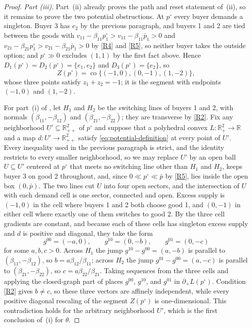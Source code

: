 \documentclass[11pt,a4paper,fleqn]{article}
\theoremstyle{plain}
\theoremstyle{definition}
\newcommand{\R}{\mathbb{R}}
\newcommand{\co}{\operatorname{co}}
\begin{document}
\begin{proof}
\emph{Part \textup{(iii)}.} Part~\textup{(ii)} already proves the path and reset statement of \,(ii), so it remains to prove the two potential obstructions. At $p^\circ$ every buyer demands a singleton. Buyer 3 has $e_2$ by the previous paragraph, and buyers 1 and 2 are tied between the goods with $v_{11}-\beta_{11}p^\circ_1>v_{11}-\beta_{11}\bar p_1>0$ and $v_{21}-\beta_{21}p^\circ_1>v_{21}-\beta_{21}\bar p_1>0$ by \ref{R4} and \ref{R5}, so neither buyer takes the outside option; and $p^\circ\gg0$ excludes $(1,1)$ by the first fact above. Hence $D_1(p^\circ)=D_2(p^\circ)=\{e_1,e_2\}$ and $D_3(p^\circ)=\{e_2\}$, so
\[
Z(p^\circ)=\co\{(-1,0),(0,-1),(1,-2)\},
\]
whose three points satisfy $z_1+z_2=-1$; it is the segment with endpoints $(-1,0)$ and $(1,-2)$.

For part~(i) of , let $H_1$ and $H_2$ be the switching lines of buyers 1 and 2, with normals $(\beta_{11},-\beta_{12})$ and $(\beta_{21},-\beta_{22})$; they are transverse by \ref{R2}. Fix any neighborhood $U'\subseteq\R_{++}^2$ of $p^\circ$ and suppose that a polyhedral convex $L:\R_+^2\to\R$ and a map $d:U'\to\R_{++}^2$ satisfy \eqref{eq:potential-definition} at every point of $U'$. Every inequality used in the previous paragraph is strict, and the identity restricts to every smaller neighborhood, so we may replace $U'$ by an open ball $U\subseteq U'$ centered at $p^\circ$ that meets no switching line other than $H_1$ and $H_2$, keeps buyer 3 on good 2 throughout, and, since $0\ll p^\circ\ll\bar p$ by \ref{R5}, lies inside the open box $(0,\bar p)$. The two lines cut $U$ into four open sectors, and the intersection of $U$ with each demand cell is one sector, connected and open. Excess supply is $(-1,0)$ in the cell where buyers 1 and 2 both choose good 1, and $(0,-1)$ in either cell where exactly one of them switches to good 2. By  the three cell gradients are constant, and because each of these cells has singleton excess supply and $d$ is positive and diagonal, they take the form
\[
g^{00}=(-a,0),\qquad g^{10}=(0,-b),\qquad g^{01}=(0,-c)
\]
for some $a,b,c>0$. Across $H_1$ the jump $g^{10}-g^{00}=(a,-b)$ is parallel to $(\beta_{11},-\beta_{12})$, so $b=a\beta_{12}/\beta_{11}$; across $H_2$ the jump $g^{01}-g^{00}=(a,-c)$ is parallel to $(\beta_{21},-\beta_{22})$, so $c=a\beta_{22}/\beta_{21}$. Taking sequences from the three cells and applying the closed-graph part of  places $g^{00}$, $g^{10}$, and $g^{01}$ in $\partial_+L(p^\circ)$. Condition \ref{R2} gives $b\ne c$, so these three vectors are affinely independent, while every positive diagonal rescaling of the segment $Z(p^\circ)$ is one-dimensional. This contradiction holds for the arbitrary neighborhood $U'$, which is the first conclusion of \,(i) for $\theta$.


\end{proof}
\end{document}
